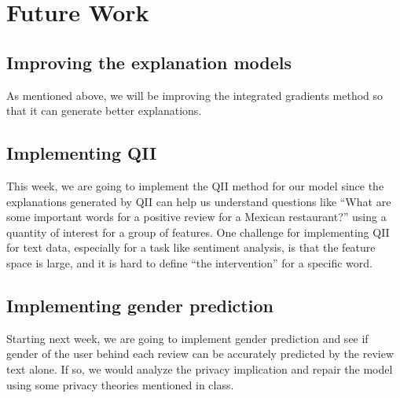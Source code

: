 \documentclass[11pt]{article}
\begin{document}
\section{Future Work}

\subsection{Improving the explanation models}

As mentioned above, we will be improving the integrated gradients method so that it can generate better explanations.

\subsection{Implementing QII}

This week, we are going to implement the QII method \cite{Datta2017} for our model since the explanations generated by QII can help us understand questions like ``What are some important words for a positive review for a Mexican restaurant?'' using a quantity of interest for a group of features. One challenge for implementing QII for text data, especially for a task like sentiment analysis, is that the feature space is large, and it is hard to define ``the intervention'' for a specific word.

\subsection{Implementing gender prediction}

Starting next week, we are going to implement gender prediction and see if gender of the user behind each review can be accurately predicted by the review text alone. If so, we would analyze the privacy implication and repair the model using some privacy theories mentioned in class.



\end{document}

